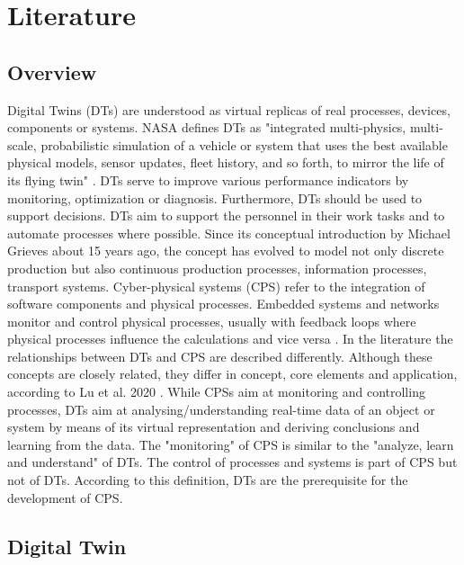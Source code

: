 \chapter{Literature}
\newpage

\section{Overview}

Digital Twins (DTs) are understood as virtual replicas of real processes, devices, components or systems. NASA defines DTs as "integrated multi-physics, multi-scale, probabilistic simulation of a vehicle or system that uses the best available physical models, sensor updates, fleet history, and so forth, to mirror the life of its flying twin" \cite{glaessgen2012digital}. DTs serve to improve various performance indicators by monitoring, optimization or diagnosis. Furthermore, DTs should be used to support decisions. DTs aim to support the personnel in their work tasks and to automate processes where possible. Since its conceptual introduction by Michael Grieves \cite{michael2014grieves} about 15 years ago, the concept has evolved to model not only discrete production but also continuous production processes, information processes, transport systems. Cyber-physical systems (CPS) refer to the integration of software components and physical processes. Embedded systems and networks monitor and control physical processes, usually with feedback loops where physical processes influence the calculations and vice versa \cite{lee2008cyber}. In the literature the relationships between DTs and CPS are described differently. Although these concepts are closely related, they differ in concept, core elements and application, according to Lu et al. 2020 \cite{lu2020digital}. While CPSs aim at monitoring and controlling processes, DTs aim at analysing/understanding real-time data of an object or system by means of its virtual representation and deriving conclusions and learning from the data. The "monitoring" of CPS is similar to the "analyze, learn and understand" of DTs. The control of processes and systems is part of CPS but not of DTs. According to this definition, DTs are the prerequisite for the development of CPS.

\section{Digital Twin}

